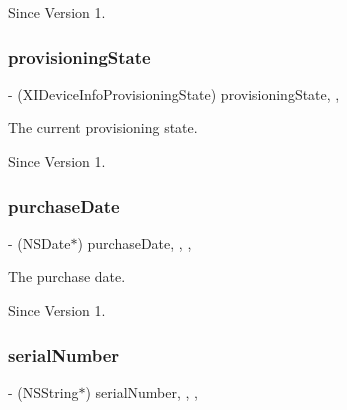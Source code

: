 \begin{DoxySince}{Since}
Version 1. 
\end{DoxySince}
\hypertarget{class_x_i_device_info_a7ef1e9cac2ea7949086b790b252ce4f2}{}\label{class_x_i_device_info_a7ef1e9cac2ea7949086b790b252ce4f2} 
\subsubsection{\texorpdfstring{provisioning\+State}{provisioningState}}
{\footnotesize\ttfamily -\/ (X\+I\+Device\+Info\+Provisioning\+State) provisioning\+State\hspace{0.3cm}{\ttfamily [read]}, {\ttfamily [nonatomic]}, {\ttfamily [assign]}}



The current provisioning state. 

\begin{DoxySince}{Since}
Version 1. 
\end{DoxySince}
\hypertarget{class_x_i_device_info_a764ddcb5a675766b6114c56debe13ac8}{}\label{class_x_i_device_info_a764ddcb5a675766b6114c56debe13ac8} 
\subsubsection{\texorpdfstring{purchase\+Date}{purchaseDate}}
{\footnotesize\ttfamily -\/ (N\+S\+Date$\ast$) purchase\+Date\hspace{0.3cm}{\ttfamily [read]}, {\ttfamily [write]}, {\ttfamily [nonatomic]}, {\ttfamily [assign]}}



The purchase date. 

\begin{DoxySince}{Since}
Version 1. 
\end{DoxySince}
\hypertarget{class_x_i_device_info_a74d409685fc6546a9272636806985147}{}\label{class_x_i_device_info_a74d409685fc6546a9272636806985147} 
\subsubsection{\texorpdfstring{serial\+Number}{serialNumber}}
{\footnotesize\ttfamily -\/ (N\+S\+String$\ast$) serial\+Number\hspace{0.3cm}{\ttfamily [read]}, {\ttfamily [write]}, {\ttfamily [nonatomic]}, {\ttfamily [assign]}}



